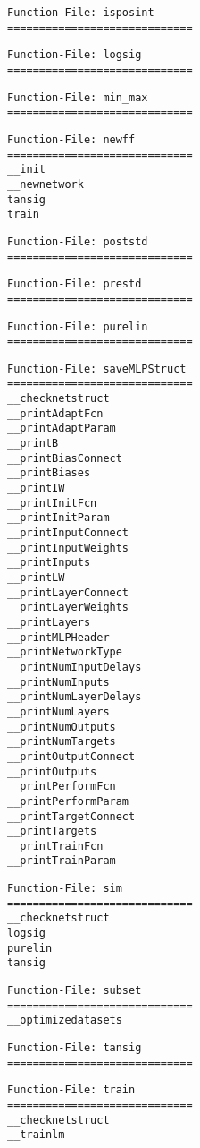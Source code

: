 \begin{verbatim}
Function-File: isposint
=============================
\end{verbatim}
\begin{verbatim}
Function-File: logsig
=============================
\end{verbatim}
\begin{verbatim}
Function-File: min_max
=============================
\end{verbatim}
\begin{verbatim}
Function-File: newff
=============================
__init
__newnetwork
tansig
train
\end{verbatim}
\begin{verbatim}
Function-File: poststd
=============================
\end{verbatim}
\begin{verbatim}
Function-File: prestd
=============================
\end{verbatim}
\begin{verbatim}
Function-File: purelin
=============================
\end{verbatim}
\begin{verbatim}
Function-File: saveMLPStruct
=============================
__checknetstruct
__printAdaptFcn
__printAdaptParam
__printB
__printBiasConnect
__printBiases
__printIW
__printInitFcn
__printInitParam
__printInputConnect
__printInputWeights
__printInputs
__printLW
__printLayerConnect
__printLayerWeights
__printLayers
__printMLPHeader
__printNetworkType
__printNumInputDelays
__printNumInputs
__printNumLayerDelays
__printNumLayers
__printNumOutputs
__printNumTargets
__printOutputConnect
__printOutputs
__printPerformFcn
__printPerformParam
__printTargetConnect
__printTargets
__printTrainFcn
__printTrainParam
\end{verbatim}
\begin{verbatim}
Function-File: sim
=============================
__checknetstruct
logsig
purelin
tansig
\end{verbatim}
\begin{verbatim}
Function-File: subset
=============================
__optimizedatasets
\end{verbatim}
\begin{verbatim}
Function-File: tansig
=============================
\end{verbatim}
\begin{verbatim}
Function-File: train
=============================
__checknetstruct
__trainlm
\end{verbatim}
